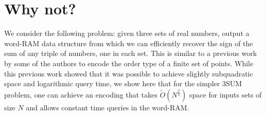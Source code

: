 \chapter{Why not?}

  We consider the following problem: given three sets of real numbers, output
  a word-RAM data structure from which we can efficiently recover the sign of the sum of any triple of numbers,
  one in each set.
  This is similar to a previous work by some of
  the authors to encode the order type of a finite set of points. While this previous
  work showed that it was possible to achieve slightly subquadratic space and
  logarithmic query time, we show here that for the simpler 3SUM problem, one
  can achieve an encoding that takes \(\tilde{O}(N^{\frac 32})\) space for inputs sets
  of size \(N\) and allows constant time queries in the word-RAM.
